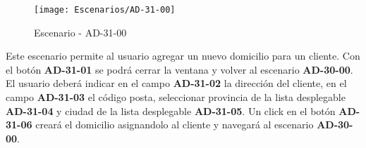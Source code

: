 \begin{figure}[H]
\centering
\texttt{[image: Escenarios/AD-31-00]}
\caption{Escenario - AD-31-00}
\label{fig:AD-31-00}
\end{figure}
Este escenario permite al usuario agregar un nuevo domicilio para un cliente.
Con el botón \textbf{AD-31-01} se podrá cerrar la ventana y volver al escenario \textbf{AD-30-00}.
El usuario deberá indicar en el campo \textbf{AD-31-02} la dirección del cliente, en el campo \textbf{AD-31-03} el código posta, seleccionar provincia de la lista desplegable \textbf{AD-31-04} y ciudad de la lista desplegable \textbf{AD-31-05}.
Un click en el botón \textbf{AD-31-06} creará el domicilio asignandolo al cliente y navegará al escenario \textbf{AD-30-00}.
\clearpage

